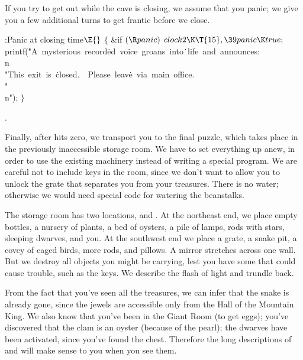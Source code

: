 If you try to get out while the cave is closing, we assume that you panic;
we give you a few additional turns to get frantic before we close.

\Y\B\4:Panic at closing time\X${}\E{}$\6
${}\{{}$\1\6
\&{if} ${}(\R\\{panic}){}$\1\5
${}\\{clock2}\K\T{15},\39\\{panic}\K\\{true};{}$\2\6
\\{printf}(\.{"A\ mysterious\ record}\)\.{ed\ voice\ groans\ into}\)\.{\ life\ and\ announces:}\)\.{\\n\ \ \ \\"This\ exit\ is\ }\)\.{closed.\ \ Please\ leav}\)\.{e\ via\ main\ office.\\"}\)\.{\\n"});\6
\4${}\}{}$\2\par
{}.\fi

Finally, after  hits zero, we transport you to the final puzzle,
which takes place in the previously inaccessible storage room. We have to
set everything up anew, in order to use the existing machinery instead
of writing a special program. We are careful not to include keys
in the room, since we don't want to allow you to unlock the grate that
separates you from your treasures. There is no water; otherwise we
would need special code for watering the beanstalks.

The storage room has two locations,  and . At the northeast
end, we place empty bottles, a nursery of plants, a bed of oysters, a pile
of lamps, rods with stars, sleeping dwarves, and you. At the southwest end
we place a grate, a snake pit, a covey of caged birds, more rods, and
pillows. A mirror stretches across one wall. But we destroy all objects
you might be carrying, lest you have some that could cause trouble,
such as the keys.  We describe the flash of light and trundle back.

From the fact that you've seen all the treasures, we can infer that
the snake is already gone, since the jewels are accessible only from
the Hall of the Mountain King. We also know that you've been in the
Giant Room (to get eggs); you've discovered that the clam is
an oyster (because of the pearl); the dwarves have been activated,
since you've found the chest. Therefore the long descriptions of
 and  will make sense to you when you see them.

